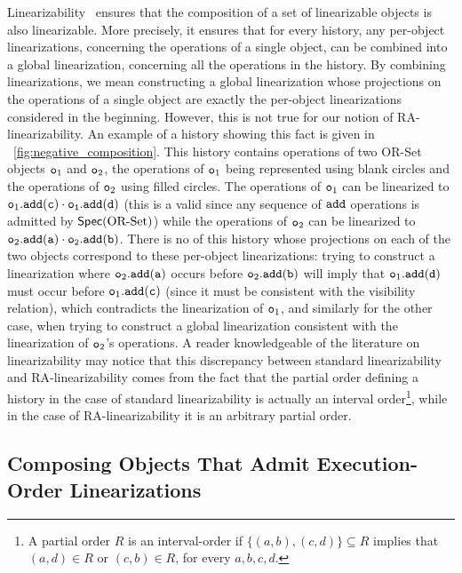 Linearizability~\cite{HerlihyW90} ensures that the composition of a set of linearizable objects is also linearizable. More precisely, it ensures that for every history, any per-object linearizations, concerning the operations of a single object, can be combined into a global linearization, concerning all the operations in the history. By combining linearizations, we mean constructing a global linearization whose projections on the operations of a single object are exactly the per-object linearizations considered in the beginning.
However, this is not true for our notion of RA-linearizability. An example of a history showing this fact is given in \figureautorefname~\ref{fig:negative_composition}. This history contains operations of two OR-Set objects $\mathtt{o}_1$ and $\mathtt{o}_2$, the operations of $\mathtt{o}_1$ being represented using blank circles and the operations of $\mathtt{o}_2$ using filled circles. The operations of $\mathtt{o}_1$ can be linearized to $\aobj_1.\alabelshort[{\tt add}]{c}\cdot \aobj_1.\alabelshort[{\tt add}]{d}$ (this is a valid \crdtlinearization{} since any sequence of ${\tt add}$ operations is admitted by $\mathsf{Spec}(\text{OR\text{-}Set})$) while the operations of $\mathtt{o}_2$ can be linearized to $\aobj_2.\alabelshort[{\tt add}]{a}\cdot \aobj_2.\alabelshort[{\tt add}]{b}$. There is no \crdtlinearization{} of this history whose projections on each of the two objects correspond to these per-object linearizations: trying to construct a linearization where $\aobj_2.\alabelshort[{\tt add}]{a}$ occurs before $\aobj_2.\alabelshort[{\tt add}]{b}$ will imply that $\aobj_1.\alabelshort[{\tt add}]{d}$ must occur before $\aobj_1.\alabelshort[{\tt add}]{c}$ (since it must be consistent with the visibility relation), which contradicts the linearization of $\mathtt{o}_1$, and similarly for the other case, when trying to construct a global linearization consistent with the linearization of $\mathtt{o}_2$'s operations. A reader knowledgeable of the literature on linearizability may notice that this discrepancy between standard linearizability and RA-linearizability comes from the fact that the partial order defining a history in the case of standard linearizability is actually an interval order\footnote{A partial order $R$ is an interval-order if $\{(a,b), (c,d)\} \subseteq R$ implies that $(a,d) \in R$ or $(c,b) \in R$, for every $a,b,c,d$.}, while in the case of RA-linearizability it is an arbitrary partial order.


\subsection{Composing Objects That Admit Execution-Order Linearizations}

